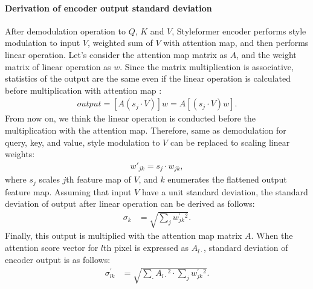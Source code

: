 \documentclass[10pt,twocolumn,letterpaper]{article}
\begin{document}
\paragraph{Derivation of encoder output standard deviation}
After demodulation operation to $Q$, $K$ and $V$, Styleformer encoder performs style modulation to input $V$, weighted sum of $V$ with attention map, and then performs linear operation. Let's consider the attention map matrix as $A$, and the weight matrix of linear operation as $w$. Since the matrix multiplication is associative, statistics of the output are the same even if the linear operation is calculated before multiplication with attention map :
\begin{align}
    \label{eq:99}
    output = [A(s_j \cdot V)] w = A [(s_j \cdot V)w].
\end{align}
From now on, we think the linear operation is conducted before the multiplication with the attention map. Therefore, same as demodulation for query, key, and value, style modulation to $V$ can be replaced to scaling linear weights:
\begin{align}
    \label{eq:100}
    w'_{jk} = s_j \cdot w_{jk},
\end{align}
where $s_{j}$ scales $j$th feature map of $V$, and $k$ enumerates the flattened output feature map. Assuming that input $V$ have a unit standard deviation, the standard deviation of output after linear operation can be derived as follows:
\begin{align}
    \label{eq:101}
    \sigma_{k} &= \sqrt{\sum_{j}{w^{'}_{jk}{^{2}}}}.
\end{align}
Finally, this output is multiplied with the attention map matrix $A$. When the attention score vector for $l$th pixel is expressed as $A_{l \cdot}$, standard deviation of encoder output is as follows:
\begin{align}
    \label{eq:103}
    \sigma^{'}_{lk} &= \sqrt{\sum_{\cdot}{A_{l\cdot}{^2}} \cdot \sum_{j}{w^{'}_{jk}{^2}}}.
\end{align}
\end{document}
